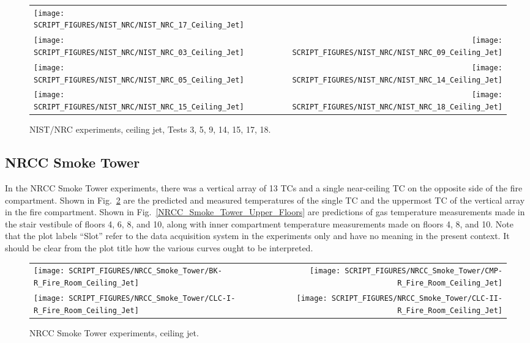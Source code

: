 \begin{figure}[p]
\begin{tabular*}{\textwidth}{l@{\extracolsep{\fill}}r}
\texttt{[image: SCRIPT\_FIGURES/NIST\_NRC/NIST\_NRC\_17\_Ceiling\_Jet]} &
 \\
\texttt{[image: SCRIPT\_FIGURES/NIST\_NRC/NIST\_NRC\_03\_Ceiling\_Jet]} &
\texttt{[image: SCRIPT\_FIGURES/NIST\_NRC/NIST\_NRC\_09\_Ceiling\_Jet]} \\
\texttt{[image: SCRIPT\_FIGURES/NIST\_NRC/NIST\_NRC\_05\_Ceiling\_Jet]} &
\texttt{[image: SCRIPT\_FIGURES/NIST\_NRC/NIST\_NRC\_14\_Ceiling\_Jet]} \\
\texttt{[image: SCRIPT\_FIGURES/NIST\_NRC/NIST\_NRC\_15\_Ceiling\_Jet]} &
\texttt{[image: SCRIPT\_FIGURES/NIST\_NRC/NIST\_NRC\_18\_Ceiling\_Jet]}
\end{tabular*}
\caption[NIST/NRC experiments, ceiling jet, Tests 3, 5, 9, 14, 15, 17, 18]
{NIST/NRC experiments, ceiling jet, Tests 3, 5, 9, 14, 15, 17, 18.}
\label{NIST_NRC_Jet_Open}
\end{figure}


\clearpage

\subsection{NRCC Smoke Tower}

In the NRCC Smoke Tower experiments, there was a vertical array of 13 TCs and a single near-ceiling TC on the opposite side of the fire compartment. Shown in Fig.~\ref{NRCC_Smoke_Tower_Ceiling_Jet} are the predicted and measured temperatures of the single TC and the uppermost TC of the vertical array in the fire compartment. Shown in Fig.~\ref{NRCC_Smoke_Tower_Upper_Floors} are predictions of gas temperature measurements made in the stair vestibule of floors 4, 6, 8, and 10, along with inner compartment temperature measurements made on floors 4, 8, and 10. Note that the plot labels ``Slot'' refer to the data acquisition system in the experiments only and have no meaning in the present context. It should be clear from the plot title how the various curves ought to be interpreted.


\begin{figure}[!ht]
\begin{tabular*}{\textwidth}{l@{\extracolsep{\fill}}r}
\texttt{[image: SCRIPT\_FIGURES/NRCC\_Smoke\_Tower/BK-R\_Fire\_Room\_Ceiling\_Jet]} &
\texttt{[image: SCRIPT\_FIGURES/NRCC\_Smoke\_Tower/CMP-R\_Fire\_Room\_Ceiling\_Jet]} \\
\texttt{[image: SCRIPT\_FIGURES/NRCC\_Smoke\_Tower/CLC-I-R\_Fire\_Room\_Ceiling\_Jet]} &
\texttt{[image: SCRIPT\_FIGURES/NRCC\_Smoke\_Tower/CLC-II-R\_Fire\_Room\_Ceiling\_Jet]}
\end{tabular*}
\caption{NRCC Smoke Tower experiments, ceiling jet.}
\label{NRCC_Smoke_Tower_Ceiling_Jet}
\end{figure}

